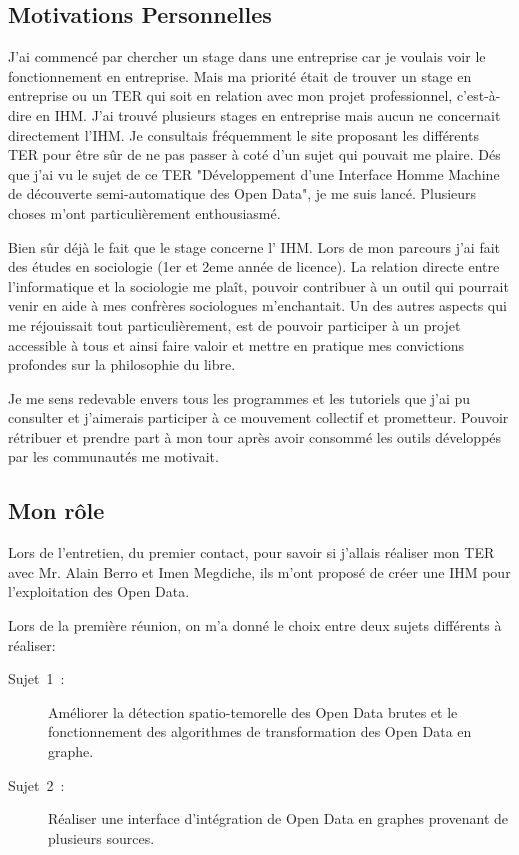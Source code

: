 \documentclass[french]{article}
\begin{document}
\subsection{Motivations Personnelles }\label{sec_motivation}


J'ai commencé par chercher un stage dans une entreprise car je voulais
voir le fonctionnement en entreprise. Mais ma priorité était de trouver
un stage en entreprise ou un TER qui soit en relation avec mon projet professionnel, c'est-à-dire
en IHM. J'ai trouvé plusieurs stages en entreprise mais aucun ne concernait directement l'IHM. 
Je consultais fréquemment le site proposant les différents TER pour
être sûr de ne pas passer à coté d'un sujet qui pouvait me plaire.
Dés que j'ai vu le sujet de ce TER "Développement
d'une Interface Homme Machine de découverte semi-automatique des Open
Data", je me suis lancé. Plusieurs choses m'ont particulièrement enthousiasmé.

Bien sûr déjà le fait que le stage concerne l' IHM.
Lors de mon parcours j'ai fait des études en sociologie (1er et 2eme
année de licence). La relation directe entre l'informatique et la sociologie
me plaît, pouvoir contribuer à un outil qui pourrait venir en
aide à mes confrères sociologues m'enchantait. Un des autres
aspects qui me réjouissait tout particulièrement, est de pouvoir participer
à un projet accessible à tous et ainsi faire valoir et mettre en pratique
mes convictions profondes sur la philosophie du libre. %

Je me sens redevable envers tous les programmes et les tutoriels que
j'ai pu consulter et j'aimerais participer à ce mouvement collectif
et prometteur. Pouvoir rétribuer et prendre part à mon tour après avoir
consommé les outils développés par les communautés me motivait. 

\subsection{Mon rôle}\label{sec_implication}

Lors de l'entretien, du premier contact, pour savoir si j'allais réaliser
mon TER avec Mr. Alain Berro et Imen Megdiche, ils m'ont proposé
de créer une IHM pour l'exploitation des Open Data. 

Lors de la première réunion, on m'a donné le choix entre deux sujets différents à réaliser:
\begin{description}
\item [{Sujet~1~:}] Améliorer la détection spatio-temorelle des Open Data brutes et le fonctionnement des algorithmes de transformation des Open Data en graphe.
\item [{Sujet~2~:}] Réaliser une interface d'intégration de Open Data en graphes provenant de plusieurs sources.
\end{description}
\end{document}
